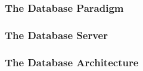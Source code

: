 \subsubsection{The Database Paradigm}


\subsubsection{The Database Server}


\subsubsection{The Database Architecture}
